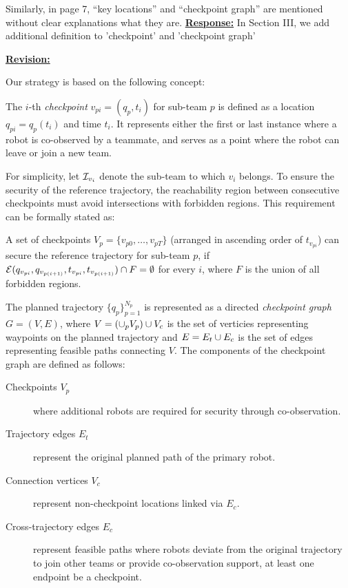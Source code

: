 \documentclass{article}
\newcommand{\re}{\tcblower \underline{\textbf{Response:}}\quad}
\newcommand{\rv}{{\large{\underline{\textbf{Revision:}}}}\quad}
\newcommand{\news}{\color{blue}}
\begin{document}
\vspace{0.3cm}
\begin{cmt}{}{}
	Similarly, in page 7, “key locations” and “checkpoint graph” are
	mentioned without clear explanations what they are.
	\re  
	In Section III, we add additional definition to 'checkpoint' and 'checkpoint graph'
\end{cmt}
\rv

{\news
Our strategy is based on the following concept:
\setcounter{definition}{5}
\setcounter{remark}{1}
\begin{definition}
The $i$-th \emph{checkpoint} $v_{pi}=(q_{p},t_{i})$ for sub-team $p$ is defined as a location $q_{pi}=q_{p}(t_i)$ and time $t_{i}$. It represents either the first or last instance where a robot is co-observed by a teammate, and serves as a point where the robot can leave or join a new team.
\end{definition}
For simplicity, let $\mathcal{I}_{v_{i}}$ denote the sub-team to which $v_{i}$ belongs. %
To ensure the security of the reference trajectory, the reachability region between consecutive checkpoints must avoid intersections with forbidden regions. This requirement can be formally stated as:
\begin{remark}\label{rmk:checkpoints}
  A set of checkpoints $V_{p}=\{ v_{p0}, \dots ,v_{pT}\}$ (arranged in ascending order of $t_{v_{pi}}$) can secure the reference trajectory for sub-team $p$, if $\mathcal{E}(q_{v_{pi}}, q_{v_{p(i+1)}}, t_{v_{pi}},t_{v_{p(i+1)}}) \cap F = \emptyset$ for every $i$, where $F$ is the union of all forbidden regions.
  \end{remark}
}
{\news 
\begin{definition}
  The planned trajectory $\{q_p\}_{p=1}^{N_p}$ is represented as a directed \emph{checkpoint graph} $G=(V, E)$, where $V = (\cup_p V_p) \cup V_c$ is the set of verticies representing waypoints on the planned trajectory and $E = E_{t} \cup E_{c}$ is the set of edges representing feasible paths connecting $V$. The components of the checkpoint graph are defined as follows:
  \begin{description}
    \item[Checkpoints $V_p$] where additional robots are required for security through co-observation.
    \item[Trajectory edges $E_t$] represent the original planned path of the primary robot.
    \item[Connection vertices $V_c$] represent non-checkpoint locations linked via $E_c$.
    \item[Cross-trajectory edges $E_c$] represent feasible paths where robots deviate from the original trajectory to join other teams or provide co-observation support, at least one endpoint be a checkpoint. 
  \end{description}
\end{definition}}
\end{document}
